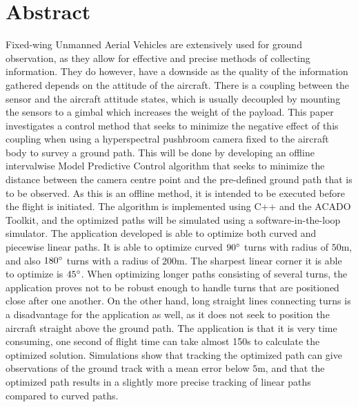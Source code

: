 \chapter*{Abstract}

Fixed-wing Unmanned Aerial Vehicles are extensively used for ground observation, as they allow for effective and precise methods of collecting information. They do however, have a downside as the quality of the information gathered depends on the attitude of the aircraft. There is a coupling between the sensor and the aircraft attitude states, which is usually decoupled by mounting the sensors to a gimbal which increases the weight of the payload. This paper investigates a control method that seeks to minimize the negative effect of this coupling when using a hyperspectral pushbroom camera fixed to the aircraft body to survey a ground path. This will be done by developing an offline intervalwise Model Predictive Control algorithm that seeks to minimize the distance between the camera centre point and the pre-defined ground path that is to be observed. As this is an offline method, it is intended to be executed before the flight is initiated. The algorithm is implemented using C++ and the ACADO Toolkit, and the optimized paths will be simulated using a software-in-the-loop simulator. The application developed is able to optimize both curved and piecewise linear paths. It is able to optimize curved $90\degree$ turns with radius of $50$m, and also $180\degree$ turns with a radius of $200$m. The sharpest linear corner it is able to optimize is $45\degree$. When optimizing longer paths consisting of several turns, the application proves not to be robust enough to handle turns that are positioned close after one another. On the other hand, long straight lines connecting turns is a disadvantage for the application as well, as it does not seek to position the aircraft straight above the ground path. The application is that it is very time consuming, one second of flight time can take almost 150s to calculate the optimized solution. Simulations show that tracking the optimized path can give observations of the ground track with a mean error below $5$m, and that the optimized path results in a slightly more precise tracking of linear paths compared to curved paths.